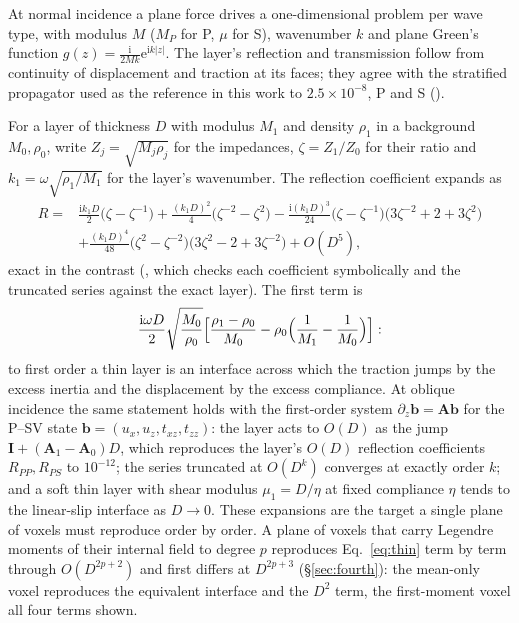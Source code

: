\documentclass[preprint,review,12pt]{elsarticle}
\newcommand{\bI}{\mathbf{I}}
\newcommand{\bA}{\mathbf{A}}
\begin{document}
At normal incidence a plane force drives a one-dimensional problem per wave type, with modulus $M$
($M_P$ for P, $\mu$ for S), wavenumber $k$ and plane Green's function
$g(z)=\tfrac{\mathrm{i}}{2Mk}\mathrm{e}^{\mathrm{i}k|z|}$. The layer's reflection and transmission follow from continuity of
displacement and traction at its faces; they agree with the stratified propagator used as the
reference in this work to $2.5\times10^{-8}$, P and S ().

For a layer of thickness $D$ with modulus $M_1$ and density $\rho_1$ in a background $M_0,\rho_0$,
write $Z_j=\sqrt{M_j\rho_j}$ for the impedances, $\zeta=Z_1/Z_0$ for their ratio and
$k_1=\omega\sqrt{\rho_1/M_1}$ for the layer's wavenumber. The reflection coefficient expands as
\begin{equation}\label{eq:thin}
\begin{aligned}
  R={}&\frac{\mathrm{i}k_1D}{2}\bigl(\zeta-\zeta^{-1}\bigr)
  +\frac{(k_1D)^2}{4}\bigl(\zeta^{-2}-\zeta^{2}\bigr)
  -\frac{\mathrm{i}(k_1D)^3}{24}\bigl(\zeta-\zeta^{-1}\bigr)\bigl(3\zeta^{-2}+2+3\zeta^{2}\bigr)\\
  &+\frac{(k_1D)^4}{48}\bigl(\zeta^{2}-\zeta^{-2}\bigr)\bigl(3\zeta^{2}-2+3\zeta^{-2}\bigr)+O(D^5),
\end{aligned}
\end{equation}
exact in the contrast (, which checks each coefficient symbolically
and the truncated series against the exact layer). The first term is
\begin{equation}\label{eq:thin1}
  \frac{\mathrm{i}\omega D}{2}\sqrt{\frac{M_0}{\rho_0}}
  \Bigl[\frac{\rho_1-\rho_0}{M_0}-\rho_0\Bigl(\frac1{M_1}-\frac1{M_0}\Bigr)\Bigr]:
\end{equation}
to first order a thin layer is an
interface across which the traction jumps by the excess inertia and the displacement by the excess
compliance. At oblique incidence the same statement holds with the first-order system
$\partial_z\mathbf b=\bA\mathbf b$ for the P--SV state $\mathbf b=(u_x,u_z,t_{xz},t_{zz})$: the layer
acts to $O(D)$ as the jump $\bI+(\bA_1-\bA_0)D$, which reproduces the layer's $O(D)$ reflection
coefficients $R_{PP},R_{PS}$ to $10^{-12}$; the series truncated at $O(D^k)$ converges at exactly
order $k$; and a soft thin layer with shear modulus $\mu_1=D/\eta$ at fixed compliance $\eta$ tends to
the linear-slip interface as $D\to0$. These expansions are the target a single plane of voxels must
reproduce order by order. A plane of voxels that carry Legendre moments of their internal field to
degree $p$ reproduces Eq.~\eqref{eq:thin} term by term through $O(D^{2p+2})$ and first differs at
$D^{2p+3}$ (\S\ref{sec:fourth}): the mean-only voxel reproduces the equivalent interface and the $D^2$
term, the first-moment voxel all four terms shown.
\end{document}
